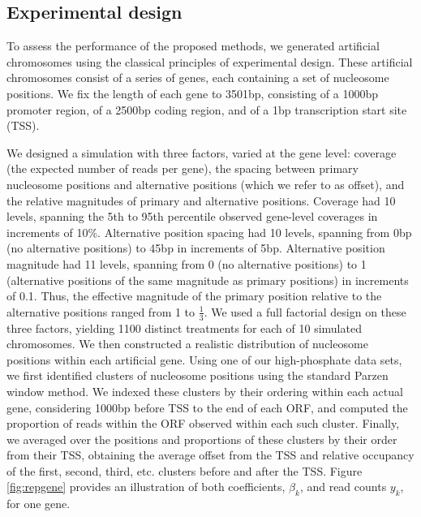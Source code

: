 \subsection{Experimental design}
\label{sec:design}

To assess the performance of the proposed methods, we generated  artificial chromosomes using the classical principles of experimental design.
These artificial chromosomes consist of a series of genes, each containing a set of nucleosome positions.
We fix the length of each gene to 3501bp, consisting of a 1000bp promoter region, of a 2500bp coding region, and of a 1bp transcription start site (TSS).

We designed a simulation with three factors, varied at the gene level: coverage (the expected number of reads per gene), the spacing between primary nucleosome positions and alternative positions (which we refer to as offset), and the relative magnitudes of  primary and alternative positions.
Coverage had 10 levels, spanning the 5th to 95th percentile observed gene-level coverages in increments of 10\%.
Alternative position spacing had 10 levels, spanning from 0bp (no alternative positions) to 45bp in increments of 5bp.
Alternative position magnitude had 11 levels, spanning from 0 (no alternative positions) to 1 (alternative positions of the same magnitude as primary positions) in increments of 0.1.
Thus, the effective magnitude of the primary position relative to the alternative positions ranged from 1 to $\frac{1}{3}$.
We used a full factorial design on these three factors, yielding 1100 distinct treatments for each of 10 simulated chromosomes.
%
We then constructed a realistic distribution of nucleosome positions within each artificial gene.
Using one of our high-phosphate data sets, we first identified clusters of nucleosome positions using the standard Parzen window method.
We indexed these clusters by their ordering within each actual gene, considering 1000bp before TSS to the end of each ORF, and computed the proportion of reads within the ORF observed within each such cluster.
Finally, we averaged over the positions and proportions of these clusters by their order from their TSS, obtaining the average offset from the TSS and relative occupancy of the first, second, third, etc. clusters before and after the TSS.
Figure \ref{fig:repgene} provides an illustration of both coefficients, $\beta_k$, and read counts $y_k$, for one gene.

